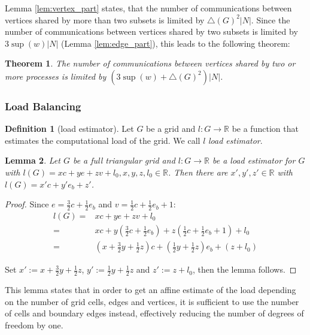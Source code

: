 \documentclass{IOS-Book-Article}
\theoremstyle{plain}
\newtheorem{theorem}{Theorem}[section]
\newtheorem{lemma}[theorem]{Lemma}
\theoremstyle{definition}
\newtheorem{definition}{Definition}[section]
\begin{document}
Lemma \ref{lem:vertex_part} states, that the number of communications between vertices shared by more than two subsets is limited by $\bigtriangleup(G)^2 |N|$. Since the number of communications between vertices shared by two subsets is limited by $3 \sup(w) |N|$ (Lemma \ref{lem:edge_part}), this leads to the following theorem:

\begin{theorem}
	 The number of communications between vertices shared by two or more processes is limited by $(3 \sup(w) + \bigtriangleup(G)^2) |N|$.
\end{theorem}

\subsubsection{Load Balancing}

\begin{definition}[load estimator]
	Let $G$ be a grid and $l: G \rightarrow \mathbb R$ be a function that estimates the computational load of the grid. We call $l$ \emph{load estimator}.
\end{definition}

\begin{lemma}
	Let $G$ be a full triangular grid and $l: G \rightarrow \mathbb R$ be a load estimator for $G$ with $l(G) = x c + y e + z v + l_0, x,y,z,l_0 \in \mathbb R$. Then there are $x', y', z' \in \mathbb R$ with $l(G) = x' c + y' e_b + z'$.
\end{lemma}

\begin{proof}
	Since $e = \frac{3}{2} c + \frac{1}{2} e_b$ and $v = \frac{1}{2} c + \frac{1}{2} e_b + 1$:
	\begin{align*}
		l(G) =& x c + y e + z v + l_0 \\
			 =& x c + y (\frac{3}{2} c + \frac{1}{2} e_b) + z (\frac{1}{2} c + \frac{1}{2} e_b + 1) + l_0 \\
			 =& (x + \frac{3}{2} y + \frac{1}{2} z) c + (\frac{1}{2} y + \frac{1}{2} z) e_b + (z + l_0)
	\end{align*}

	Set $x' := x + \frac{3}{2} y + \frac{1}{2} z$,  $y' := \frac{1}{2} y + \frac{1}{2} z$ and $z' := z + l_0$, then the lemma follows.
\end{proof}

This lemma states that in order to get an affine estimate of the load depending on the number of grid cells, edges and vertices, it is sufficient to use the number of cells and boundary edges instead, effectively reducing the number of degrees of freedom by one.
\end{document}
